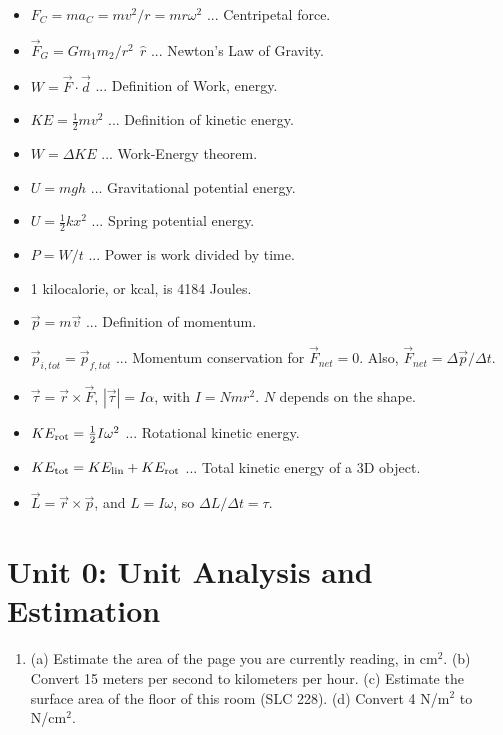 \documentclass[10pt]{article}
\begin{document}
\begin{itemize}
\item $F_C = m a_C = mv^2/r = mr\omega^2$ ... Centripetal force.
\item $\vec{F}_G = G m_1 m_2/r^2 ~~ \hat{r}$ ... Newton's Law of Gravity.
\item $W = \vec{F} \cdot \vec{d}$ ... Definition of Work, energy.
\item $KE = \frac{1}{2}mv^2$ ... Definition of kinetic energy.
\item $W = \Delta KE$ ... Work-Energy theorem.
\item $U = mgh$ ... Gravitational potential energy.
\item $U = \frac{1}{2}kx^2$ ... Spring potential energy.
\item $P = W/t$ ... Power is work divided by time.
\item 1 kilocalorie, or kcal, is 4184 Joules.
\item $\vec{p} = m\vec{v}$ ... Definition of momentum.
\item $\vec{p}_{i,tot} = \vec{p}_{f,tot}$ ... Momentum conservation for $\vec{F}_{net} = 0$.  Also, $\vec{F}_{net} = \Delta \vec{p} / \Delta t$.
\item $\vec{\tau} = \vec{r}\times \vec{F}$, $|\vec{\tau}| = I \alpha$, with $I = N m r^2$.  $N$ depends on the shape.
\item $KE_{\rm rot} = \frac{1}{2} I \omega^2$ ... Rotational kinetic energy.
\item $KE_{\rm tot} = KE_{\rm lin} + KE_{\rm rot}$ ... Total kinetic energy of a 3D object.
\item $\vec{L} = \vec{r} \times \vec{p}$, and $L = I\omega$, so $\Delta L/\Delta t = \tau$.
\end{itemize}

\section{Unit 0: Unit Analysis and Estimation}

\begin{enumerate}
\item (a) Estimate the area of the page you are currently reading, in cm$^2$. (b) Convert 15 meters per second to kilometers per hour. (c) Estimate the surface area of the floor of this room (SLC 228).  (d) Convert 4 N/m$^2$ to N/cm$^2$. \\ \vspace{1cm}
\end{enumerate}
\end{document}
